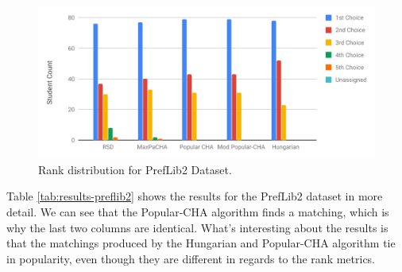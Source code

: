 \begin{figure}[h!]
  \centering
    \includegraphics[width=0.9\linewidth]{assets/plots/preflib2-ranks.pdf}
    \caption{Rank distribution for PrefLib2 Dataset.}
    \label{fig:preflib2-rank-distribution}
\end{figure}

Table \ref{tab:results-preflib2} shows the results for the PrefLib2 dataset in more detail. We can see that the Popular-CHA algorithm finds a matching, which is why the last two columns are identical. What's interesting about the results is that the matchings produced by the Hungarian and Popular-CHA algorithm tie in popularity, even though they are different in regards to the rank metrics. 

\begin{table}[h!]
  \centering
  \caption{Summary of the results for PrefLib2}
  \label{tab:results-preflib2}
\end{table}

